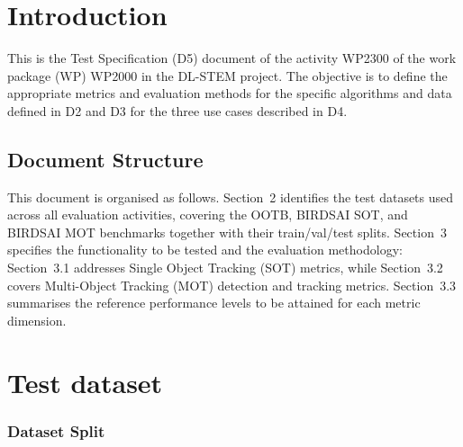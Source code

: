 \documentclass[
]{article}
\begin{document}
\newpage

\hypertarget{introduction}{%
\section{Introduction}\label{introduction}}

This is the Test Specification (D5) document of the activity WP2300 of the work package (WP) WP2000 in the DL-STEM project.
The objective is to define the appropriate metrics and evaluation methods for the specific algorithms and data defined in D2 and D3 for the three use cases described in D4.

\subsection*{Document Structure}

This document is organised as follows.
Section~2 identifies the test datasets used across all evaluation activities, covering the OOTB, BIRDSAI SOT, and BIRDSAI MOT benchmarks together with their train/val/test splits.
Section~3 specifies the functionality to be tested and the evaluation methodology: Section~3.1 addresses Single Object Tracking (SOT) metrics, while Section~3.2 covers Multi-Object Tracking (MOT) detection and tracking metrics.
Section~3.3 summarises the reference performance levels to be attained for each metric dimension.

\hypertarget{Test dataset}{%
\section{Test dataset}\label{Test dataset}}

\setlength{\LTpre}{4pt}
\setlength{\LTpost}{4pt}



\subsubsection*{Dataset Split}
\end{document}
